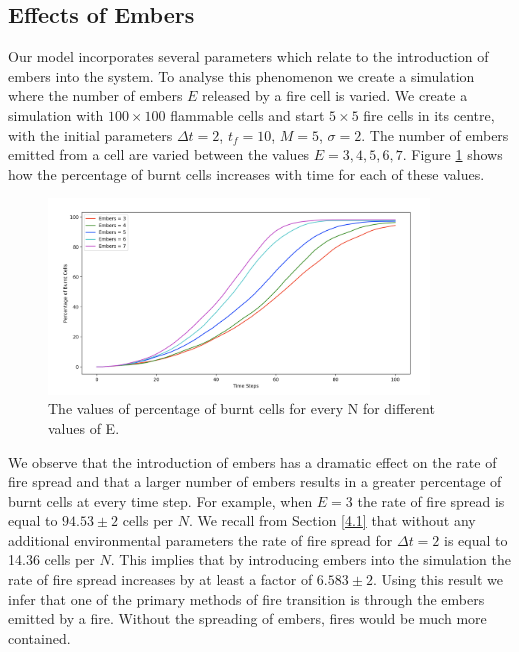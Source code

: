 \subsection{Effects of Embers}\label{4.4}

Our model incorporates several parameters which relate to the introduction of embers into the system. To analyse this phenomenon we create a simulation where the number of embers $E$ released by a fire cell is varied. We create a simulation with $100\times100$ flammable cells and start $5\times5$ fire cells in its centre, with the initial parameters $\Delta t=2$, $t_f=10$, $M=5$, $\sigma=2$. The number of embers emitted from a cell are varied between the values $E=3,4,5,6,7$. Figure \ref{f46} shows how the percentage of burnt cells increases with time for each of these values. 

\begin{figure}[H]
\begin{center}
\includegraphics[width=0.9\textwidth]{Figures/f5.png}
\caption{The values of percentage of burnt cells for every N for different values of E.} 
\label{f46}
\end{center}
\end{figure}

\noindent We observe that the introduction of embers has a dramatic effect on the rate of fire spread and that a larger number of embers results in a greater percentage of burnt cells at every time step. For example, when $E=3$ the rate of fire spread is equal to $94.53\pm2$ cells per $N$. We recall from Section \ref{4.1} that without any additional environmental parameters the rate of fire spread for $\Delta t=2$ is equal to 14.36 cells per $N$. This implies that by introducing embers into the simulation the rate of fire spread increases by at least a factor of $6.583\pm2$. Using this result we infer that one of the primary methods of fire transition is through the embers emitted by a fire. Without the spreading of embers, fires would be much more contained.

